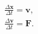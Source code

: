 \documentclass[10pt]{article}
\begin{document}
\begin{align*}\frac{\Delta {\boldsymbol x}}{\Delta t} = {\boldsymbol v} , \\
\frac{\Delta {\boldsymbol v}}{\Delta t} = {\boldsymbol F} .\end{align*}
\end{document}
